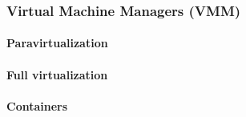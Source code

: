 \newpage

\subsubsection{Virtual Machine Managers (VMM)}\label{subsubsection: Virtual Machine Managers (VMM)}

\paragraph{Paravirtualization}

\paragraph{Full virtualization}

\paragraph{Containers}
